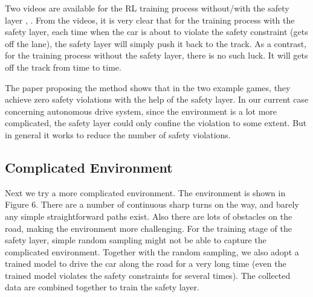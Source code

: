 \documentclass{article} %
\begin{document}
Two videos are available for the RL training process without/with the safety layer \cite{safe-RL-video1}, \cite{safe-RL-video2}. From the videos, it is very clear that for the training process with the safety layer, each time when the car is about to violate the safety constraint (gets off the lane), the safety layer will simply push it back to the track. As a contrast, for the training process without the safety layer, there is no such luck. It will gets off the track from time to time.

The paper proposing the method \cite{dalal2018safe} shows that in the two example games, they achieve zero safety violations with the help of the safety layer. In our current case concerning autonomous drive system, since the environment is a lot more complicated, the safety layer could only confine the violation to some extent. But in general it works to reduce the number of safety violations.

\subsection{Complicated Environment}
Next we try a more complicated environment. The environment is shown in Figure 6. There are a number of continuous sharp turns on the way, and barely any simple straightforward paths exist. Also there are lots of obstacles on the road, making the environment more challenging. For the training stage of the safety layer, simple random sampling might not be able to capture the complicated environment. Together with the random sampling, we also adopt a trained model to drive the car along the road for a very long time (even the trained model violates the safety constraints for several times). The collected data are combined together to train the safety layer.
\end{document}
